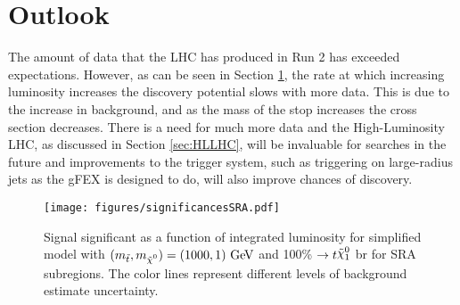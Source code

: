 \section{Outlook}


The amount of data that the LHC has produced in Run 2 has exceeded expectations.  However, as can be seen in Section \ref{fig:1tevstopreach}, the rate at which increasing luminosity increases the discovery potential slows with more data.  This is due to the increase in background, and as the mass of the stop increases the cross section decreases. There is a need for much more data and the High-Luminosity LHC, as discussed in Section \ref{sec:HLLHC}, will be invaluable for searches in the future and improvements to the trigger system, such as triggering on large-radius jets as the gFEX is designed to do, will also improve chances of discovery.  \\


\begin{figure}[!h]
	\centering
	\texttt{[image: figures/significancesSRA.pdf]}
	\caption[Significance as a function of integrated luminosity for a 1000 GeV stop]{Signal significant as a function of integrated luminosity for simplified model with $(\mstop,\mLSP) = (1000,1)~\gev$ and 100\% \stop $\ra t\ninoone$ \gls{br} for SRA subregions. The color lines represent different levels of background estimate uncertainty.}
	\label{fig:1tevstopreach}
\end{figure}



